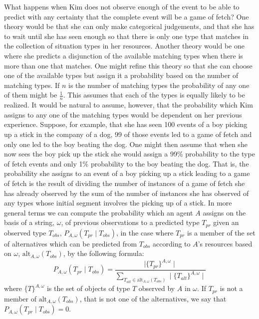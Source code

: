 What happens when Kim does not observe enough of the event to be able
to predict with any certainty that the complete event will be a game
of fetch?  One theory would be that she can only make categorical
judgements, and that she has to wait until she has seen enough so that
there is only one type that matches in the collection of situation
types in her resources.  Another theory would be
one where she predicts a disjunction of the available matching types when there is
more than one that matches.  One might refine this theory so that she
can choose one of the available types but assign it a probability
based on the number of matching types.  If $n$ is the number of
matching types the probability of any one of them might be
$\frac{1}{n}$.  This assumes that each of the types is equally likely
to be realized.  It would be natural to assume, however, that the
probability which Kim assigns to any one of the matching types would
be dependent on her previous experience.  Suppose, for example, that
she has seen 100 events of a boy picking up a stick in the company of
a dog, 99 of those events led to a game of fetch and only one led to
the boy beating the dog.  One might then assume that when she now sees
the boy pick up the stick she would assign a 99\% probability to the
type of fetch events and only 1\% probability to the boy beating the
dog.  That is, the probability she assigns to an event of a boy
picking up a stick leading to a game of fetch is the result of
dividing the number of instances of a game of fetch she has already
observed by the sum of the number of instances she has observed of any types whose
initial segment involves the picking up of a stick.  In more general
terms we can compute the probability which an agent $A$ assigns on the
basis of a string, $\omega$, of previous observations to a
predicted type $T_{\mathit{pr}}$ given an observed type $T_{\mathit{obs}}$, $P_{A,\omega}(T_{\mathit{pr}}\mid T_{\mathit{obs}})$, in the case where
$T_{\mathit{pr}}$ is a member of the set of alternatives which can be
predicted from $T_{\mathit{obs}}$ according to $A$'s resources based on $\omega$,
$\mathrm{alt}_{A,\omega}(T_{\mathit{obs}})$, by the following formula:
\[P_{A,\omega}(T_{\mathit{pr}}\mid T_{\mathit{obs}}) =
\frac{\mid\{T_{\mathit{pr}}\}^{A,\omega}\mid}{\sum\limits_{T_{\mathit{alt}}\in\mathrm{alt}_{A,\omega}(T_{\mathit{obs}})}\mid\{T_{\mathit{alt}}\}^{A,\omega}\mid}\]
where $\{T\}^{A,\omega}$ is the set of objects of type $T$ observed by $A$
in $\omega$.  If $T_{\mathit{pr}}$ is not a member of
$\mathrm{alt}_{A,\omega}(T_{\mathit{obs}})$, that is not one of the
alternatives, we say that $P_{A,\omega}(T_{\mathit{pr}}\mid
T_{\mathit{obs}}) = 0$.

